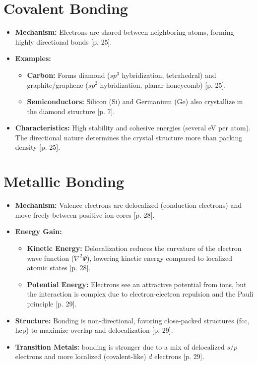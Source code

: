 \documentclass[a4paper,oneside,article]{memoir}
\begin{document}
\section{Covalent Bonding}
\begin{itemize}
    \item \textbf{Mechanism:} Electrons are shared between neighboring atoms, forming highly directional bonds [p. 25].
    \item \textbf{Examples:}
    \begin{itemize}
        \item \textbf{Carbon:} Forms diamond ($sp^3$ hybridization, tetrahedral) and graphite/graphene ($sp^2$ hybridization, planar honeycomb) [p. 25].
        \item \textbf{Semiconductors:} Silicon (Si) and Germanium (Ge) also crystallize in the diamond structure [p. 7].
    \end{itemize}
    \item \textbf{Characteristics:} High stability and cohesive energies (several eV per atom). The directional nature determines the crystal structure more than packing density [p. 25].
\end{itemize}

\section{Metallic Bonding}
\begin{itemize}
    \item \textbf{Mechanism:} Valence electrons are delocalized (conduction electrons) and move freely between positive ion cores [p. 28].
    \item \textbf{Energy Gain:}
    \begin{itemize}
        \item \textbf{Kinetic Energy:} Delocalization reduces the curvature of the electron wave function ($\nabla^2\Psi$), lowering kinetic energy compared to localized atomic states [p. 28].
        \item \textbf{Potential Energy:} Electrons see an attractive potential from ions, but the interaction is complex due to electron-electron repulsion and the Pauli principle [p. 29].
    \end{itemize}
    \item \textbf{Structure:} Bonding is non-directional, favoring close-packed structures (fcc, hcp) to maximize overlap and delocalization [p. 29].
    \item \textbf{Transition Metals:} bonding is stronger due to a mix of delocalized $s/p$ electrons and more localized (covalent-like) $d$ electrons [p. 29].
\end{itemize}
\end{document}

